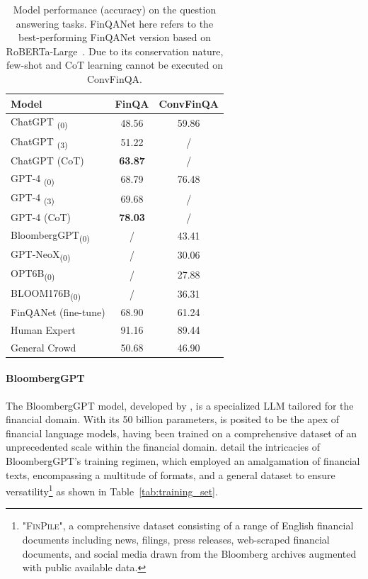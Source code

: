 \begin{table}[!h]
	\centering
	\begin{tabularx}{0.8\textwidth}{Xcc}
		\toprule
		\textbf{Model}                  & \textbf{FinQA} & \textbf{ConvFinQA} \\
		\midrule
		ChatGPT \textsubscript{(0)}     & 48.56          & 59.86              \\
		ChatGPT \textsubscript{(3)}     & 51.22          & /                  \\
		ChatGPT (CoT)                   & \textbf{63.87} & /                  \\
		GPT-4 \textsubscript{(0)}       & 68.79          & 76.48              \\
		GPT-4 \textsubscript{(3)}       & 69.68          & /                  \\
		GPT-4 (CoT)                     & \textbf{78.03} & /                  \\
		BloombergGPT\textsubscript{(0)} & /              & 43.41              \\
		GPT-NeoX\textsubscript{(0)}     & /              & 30.06              \\
		OPT6B\textsubscript{(0)}        & /              & 27.88              \\
		BLOOM176B\textsubscript{(0)}    & /              & 36.31              \\
		FinQANet (fine-tune)            & 68.90          & 61.24              \\
		Human Expert                    & 91.16          & 89.44              \\
		General Crowd                   & 50.68          & 46.90              \\
		\bottomrule
	\end{tabularx}
	\caption{Model performance (accuracy) on the question answering tasks. FinQANet here refers to the best-performing FinQANet version based on RoBERTa-Large~\cite{chen2022afinqa}. Due to its conservation nature, few-shot and CoT learning cannot be executed on ConvFinQA.}
	\label{tab:model_performance_qa}
\end{table}

\paragraph{BloombergGPT}
\label{par:bloomberggpt}

The BloombergGPT model, developed by \textcite{wu2023bloomberggpt}, is a specialized LLM tailored for the financial domain.
With its 50 billion parameters, is posited to be the apex of financial language models, having been trained on a comprehensive dataset of an unprecedented scale within the financial domain.
\textcite{wu2023bloomberggpt} detail the intricacies of BloombergGPT's training regimen, which employed an amalgamation of financial texts, encompassing a multitude of formats, and a general dataset to ensure versatility\footnote{"\textsc{FinPile}", a comprehensive dataset consisting of a range of English financial documents including news, filings, press releases, web-scraped financial documents, and social media drawn from the Bloomberg archives augmented with public available data.} as shown in Table~\ref{tab:training_set}.

